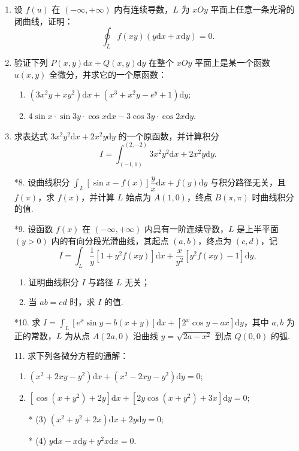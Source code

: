\begin{enumerate}
    \item 设 $f(u)$ 在 $(-\infty, +\infty)$ 内有连续导数，$L$ 为 $xOy$ 平面上任意一条光滑的闭曲线，证明：
    \[
        \oint_{L}f(xy)(y\text{d}x+x\text{d}y) = 0.
    \]

    \item 验证下列 $P(x, y)\text{d}x+Q(x, y)\text{d}y$ 在整个 $xOy$ 平面上是某一个函数 $u(x, y)$ 全微分，并求它的一个原函数：
    \begin{enumerate}[(1)]\setlength{\itemsep}{5pt}\setlength{\topsep}{15pt}
        \item $(3x^2y+xy^2)\text{d}x+(x^3+x^2y-e^y+1)\text{d}y$;
        \item $4\sin x\cdot\sin 3y\cdot\cos x\text{d}x-3\cos3y\cdot\cos2x\text{d}y$.
    \end{enumerate}

    \item 求表达式 $3x^2y^2\text{d}x+2x^2y\text{d}y$ 的一个原函数，并计算积分
    \[
        I=\int_{(-1, 1)}^{(2, -2)}3x^2y^2\text{d}x+2x^2y\text{d}y.
    \]

    \item[*8.] 设曲线积分 $\displaystyle\int_{L}[\sin x-f(x)]\dfrac{y}{x}\text{d}x+f(y)\text{d}y$ 与积分路径无关，且 $f(\pi)$，求 $f(x)$，并计算 $L$ 始点为 $A(1, 0)$，终点 $B(\pi, \pi)$ 时曲线积分的值.
    
    \item[*9.] 设函数 $f(x)$ 在 $(-\infty, +\infty)$ 内具有一阶连续导数，$L$ 是上半平面 $(y>0)$ 内的有向分段光滑曲线，其起点 $(a, b)$，终点为 $(c, d)$，记
    \[
        I=\int_{L}\dfrac{1}{y}[1+y^2f(xy)]\text{d}x+\dfrac{x}{y^2}[y^2f(xy)-1]\text{d}y,
    \]
    \begin{enumerate}[(1)]\setlength{\itemsep}{5pt}\setlength{\topsep}{15pt}
        \item 证明曲线积分 $I$ 与路径 $L$ 无关；
        \item 当 $ab=cd$ 时，求 $I$ 的值.
    \end{enumerate}

    \item[*10.] 求 $\displaystyle I=\int_{L}[e^x\sin y-b(x+y)]\text{d}x+[2^x\cos y-ax]\text{d}y$，其中 $a, b$ 为正的常数，$L$ 为从点 $A(2a, 0)$ 沿曲线 $y=\sqrt{2a-x^2}$ 到点 $Q(0, 0)$ 的弧.
    
    \item[11.] 求下列各微分方程的通解：
    \begin{enumerate}[(1)]\setlength{\itemsep}{5pt}\setlength{\topsep}{15pt}
        \item $\displaystyle(x^2+2xy-y^2)\text{d}x+(x^2-2xy-y^2)\text{d}y=0$;
        \item $\displaystyle[\cos(x+y^2)+2y]\text{d}x+[2y\cos(x+y^2)+3x]\text{d}y=0$;
        \item[* (3)] $\displaystyle(x^2+y^2+2x)\text{d}x+2y\text{d}y=0$;
        \item[* (4)] $\displaystyle y\text{d}x-x\text{d}y+y^2x\text{d}x=0.$ 
    \end{enumerate} 

\end{enumerate}


